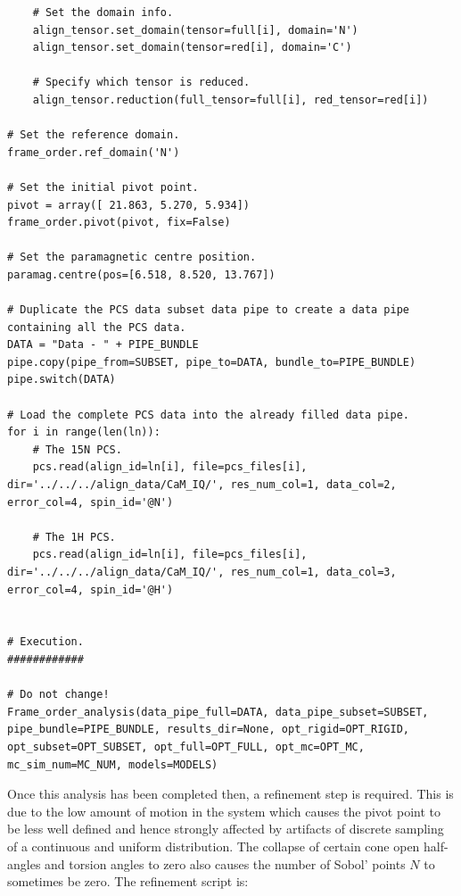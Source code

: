 \begin{lstlisting}
    # Set the domain info.
    align_tensor.set_domain(tensor=full[i], domain='N')
    align_tensor.set_domain(tensor=red[i], domain='C')

    # Specify which tensor is reduced.
    align_tensor.reduction(full_tensor=full[i], red_tensor=red[i])

# Set the reference domain.
frame_order.ref_domain('N')

# Set the initial pivot point.
pivot = array([ 21.863, 5.270, 5.934])
frame_order.pivot(pivot, fix=False)

# Set the paramagnetic centre position.
paramag.centre(pos=[6.518, 8.520, 13.767])

# Duplicate the PCS data subset data pipe to create a data pipe containing all the PCS data.
DATA = "Data - " + PIPE_BUNDLE
pipe.copy(pipe_from=SUBSET, pipe_to=DATA, bundle_to=PIPE_BUNDLE)
pipe.switch(DATA)

# Load the complete PCS data into the already filled data pipe.
for i in range(len(ln)):
    # The 15N PCS.
    pcs.read(align_id=ln[i], file=pcs_files[i], dir='../../../align_data/CaM_IQ/', res_num_col=1, data_col=2, error_col=4, spin_id='@N')

    # The 1H PCS.
    pcs.read(align_id=ln[i], file=pcs_files[i], dir='../../../align_data/CaM_IQ/', res_num_col=1, data_col=3, error_col=4, spin_id='@H')


# Execution.
############

# Do not change!
Frame_order_analysis(data_pipe_full=DATA, data_pipe_subset=SUBSET, pipe_bundle=PIPE_BUNDLE, results_dir=None, opt_rigid=OPT_RIGID, opt_subset=OPT_SUBSET, opt_full=OPT_FULL, opt_mc=OPT_MC, mc_sim_num=MC_NUM, models=MODELS)
\end{lstlisting}

Once this analysis has been completed then, a refinement step is required.
This is due to the low amount of motion in the system which causes the pivot point to be less well defined and hence strongly affected by artifacts of discrete sampling of a continuous and uniform distribution.
The collapse of certain cone open half-angles and torsion angles to zero also causes the number of Sobol' points $N$ to sometimes be zero.
The refinement script is:

